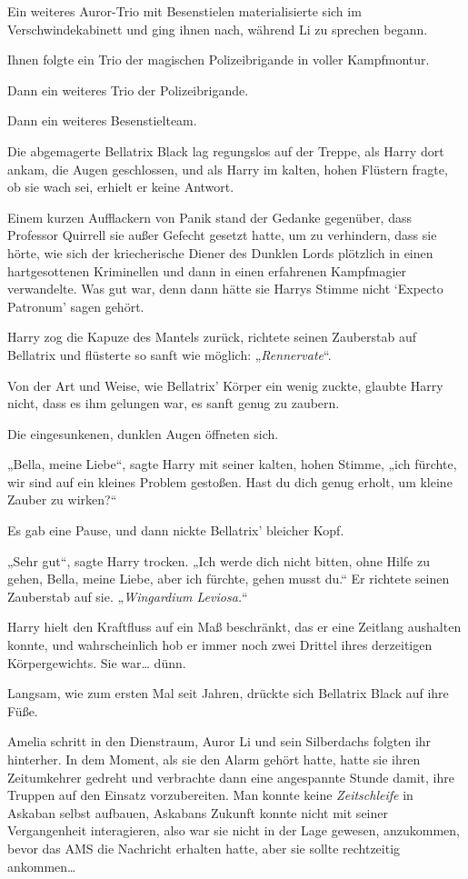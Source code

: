 {Ein weiteres Auror-Trio mit Besenstielen materialisierte sich im Verschwindekabinett und ging ihnen nach, während Li zu sprechen begann.

Ihnen folgte ein Trio der magischen Polizeibrigande in voller Kampfmontur.

Dann ein weiteres Trio der Polizeibrigande.

Dann ein weiteres Besenstielteam.

Die abgemagerte Bellatrix Black lag regungslos auf der Treppe, als Harry dort ankam, die Augen geschlossen, und als Harry im kalten, hohen Flüstern fragte, ob sie wach sei, erhielt er keine Antwort.

Einem kurzen Aufflackern von Panik stand der Gedanke gegenüber, dass Professor Quirrell sie außer Gefecht gesetzt hatte, um zu verhindern, dass sie hörte, wie sich der kriecherische Diener des Dunklen Lords plötzlich in einen hartgesottenen Kriminellen und dann in einen erfahrenen Kampfmagier verwandelte. Was gut war, denn dann hätte sie Harrys Stimme nicht `Expecto Patronum' sagen gehört.

Harry zog die Kapuze des Mantels zurück, richtete seinen Zauberstab auf Bellatrix und flüsterte so sanft wie möglich: „\emph{Rennervate}“.

Von der Art und Weise, wie Bellatrix' Körper ein wenig zuckte, glaubte Harry nicht, dass es ihm gelungen war, es sanft genug zu zaubern.

Die eingesunkenen, dunklen Augen öffneten sich.

„Bella, meine Liebe“, sagte Harry mit seiner kalten, hohen Stimme, „ich fürchte, wir sind auf ein kleines Problem gestoßen. Hast du dich genug erholt, um kleine Zauber zu wirken?“

Es gab eine Pause, und dann nickte Bellatrix' bleicher Kopf.

„Sehr gut“, sagte Harry trocken. „Ich werde dich nicht bitten, ohne Hilfe zu gehen, Bella, meine Liebe, aber ich fürchte, gehen musst du.“ Er richtete seinen Zauberstab auf sie. „\emph{Wingardium Leviosa.}“

Harry hielt den Kraftfluss auf ein Maß beschränkt, das er eine Zeitlang aushalten konnte, und wahrscheinlich hob er immer noch zwei Drittel ihres derzeitigen Körpergewichts. Sie war… dünn.

Langsam, wie zum ersten Mal seit Jahren, drückte sich Bellatrix Black auf ihre Füße.

Amelia schritt in den Dienstraum, Auror Li und sein Silberdachs folgten ihr hinterher. In dem Moment, als sie den Alarm gehört hatte, hatte sie ihren Zeitumkehrer gedreht und verbrachte dann eine angespannte Stunde damit, ihre Truppen auf den Einsatz vorzubereiten. Man konnte keine \emph{Zeitschleife} in Askaban selbst aufbauen, Askabans Zukunft konnte nicht mit seiner Vergangenheit interagieren, also war sie nicht in der Lage gewesen, anzukommen, bevor das AMS die Nachricht erhalten hatte, aber sie sollte rechtzeitig ankommen…

}
